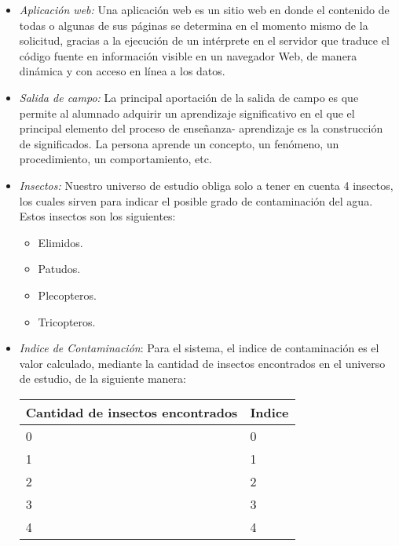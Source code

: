         \begin{itemize}
 
        \item \emph{Aplicación web:} Una aplicación web es un sitio web en donde el contenido de todas o algunas de sus páginas se determina en el momento mismo de la solicitud, gracias a la ejecución de un intérprete en el servidor que traduce el código fuente en información visible en un navegador Web, de manera dinámica y con acceso en línea a los datos.
 
        \item \emph{Salida de campo:} La principal aportación de la salida de campo es que permite al alumnado adquirir un aprendizaje significativo en el que el principal elemento del proceso de enseñanza- aprendizaje es la construcción de significados. La persona aprende un concepto, un fenómeno, un procedimiento, un comportamiento, etc.

        \item \emph{Insectos:} Nuestro universo de estudio obliga solo a tener en cuenta 4 insectos, los cuales sirven para indicar el posible grado de contaminación del agua. Estos insectos son los siguientes:
            \begin{itemize}
                \item Elimidos.
                \item Patudos.
                \item Plecopteros.
                \item Tricopteros.
            \end{itemize}

        \item \emph{Indice de Contaminación}: Para el sistema, el indice de contaminación es el valor calculado, mediante la cantidad de insectos encontrados en el universo de estudio, de la siguiente manera:
        \begin{table}[H]
            \centering
            \begin{tabular}{|p{3.8cm}|l|}
                \hline
                \centering
                Cantidad de insectos encontrados  & Indice \\ \hline
                            0                     & 0 \\ \hline
                            1                     & 1 \\ \hline
                            2                     & 2 \\ \hline
                            3                     & 3 \\ \hline
                            4                     & 4 \\ 
                            \hline
            \end{tabular}
        \end{table}

        \end{itemize}

